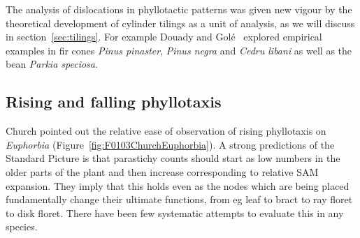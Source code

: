 
The analysis of dislocations in phyllotactic patterns was given new vigour by the theoretical development of cylinder tilings as a unit of analysis, as we will discuss in section~\ref{sec:tilings}. For example Douady and Golé~\autocite{douadyFibonacciQuasisymmetricPhyllotaxis2016} explored empirical examples in fir cones \textit{Pinus pinaster}, \textit{Pinus negra} and \textit{Cedru libani} as well as the bean \textit{Parkia speciosa}. 

  
 \subsection{Rising and falling phyllotaxis}
Church pointed out the relative ease of observation of rising phyllotaxis on \textit{Euphorbia} (Figure~\ref{fig:F0103ChurchEuphorbia}). 
A strong predictions of the Standard Picture is that parastichy counts should start as low numbers in the older parts of the plant and then increase corresponding to relative SAM expansion. They imply that this holds even as the nodes which are being placed fundamentally change their ultimate functions, from eg leaf to bract to ray floret to disk floret. There have been few systematic attempts to evaluate this in any species. 

